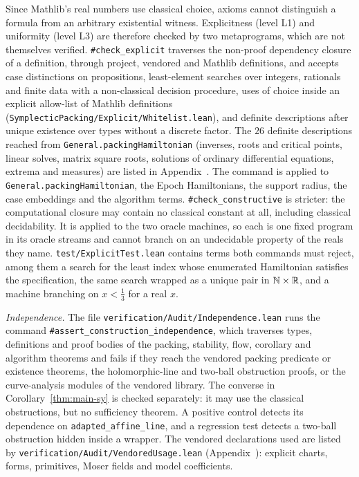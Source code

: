 Since Mathlib's real numbers use classical choice, axioms cannot distinguish a formula from an arbitrary existential
witness. Explicitness (level L1) and uniformity (level L3) are therefore checked by two metaprograms, which are not
themselves verified. \texttt{\#check\_explicit} traverses the non-proof dependency closure of a definition, through
project, vendored and Mathlib definitions, and accepts case distinctions on propositions, least-element searches over
integers, rationals and finite data with a non-classical decision procedure, uses of choice inside an explicit allow-list of Mathlib definitions
(\texttt{SymplecticPacking/Explicit/Whitelist.lean}), and definite descriptions after unique existence over types without a discrete factor. The $26$
definite descriptions reached from \texttt{General.packingHamiltonian} (inverses, roots and critical points, linear
solves, matrix square roots, solutions of ordinary differential equations, extrema and measures) are listed in Appendix~. The command is applied to \texttt{General.packingHamiltonian}, the Epoch Hamiltonians, the support
radius, the case embeddings and the algorithm terms. \texttt{\#check\_constructive} is stricter: the computational
closure may contain no classical constant at all, including classical decidability. It is applied to the two oracle
machines, so each is one fixed program in its oracle streams and cannot branch on an undecidable property of the
reals they name. \texttt{test/ExplicitTest.lean} contains terms both commands must reject, among them a search for the
least index whose enumerated Hamiltonian satisfies the specification, the same search wrapped as a unique pair in
$\mathbb{N}\times\mathbb{R}$, and a machine branching on $x<\frac13$ for a real $x$.

\emph{Independence.} The file \texttt{verification/Audit/Independence.lean} runs the command
\texttt{\#assert\_construction\_independence}, which traverses types, definitions and proof bodies of the packing, stability,
flow, corollary and algorithm theorems and fails if they reach the vendored packing predicate or existence theorems, the
holomorphic-line and two-ball obstruction proofs, or the curve-analysis modules of the vendored library. The converse
in Corollary~\ref{thm:main-sy} is checked separately: it may use the classical obstructions, but no sufficiency
theorem. A positive control detects its dependence on \texttt{adapted\_affine\_line}, and a regression test detects a
two-ball obstruction hidden inside a wrapper. The vendored declarations used are listed by
\texttt{verification/Audit/VendoredUsage.lean} (Appendix~): explicit charts, forms, primitives, Moser
fields and model coefficients.

